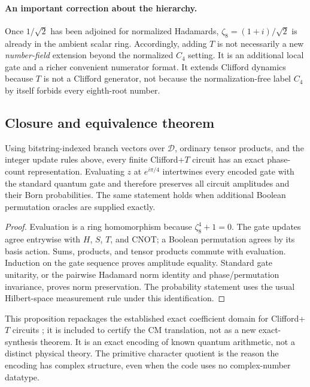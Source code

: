 \paragraph{An important correction about the hierarchy.}
Once $1/\sqrt2$ has been adjoined for normalized Hadamards, $\zeta_8=(1+i)/\sqrt2$ is already in the ambient scalar ring. Accordingly, adding $T$ is not necessarily a new \emph{number-field} extension beyond the normalized $C_4$ setting. It is an additional local gate and a richer convenient numerator format. It extends Clifford dynamics because $T$ is not a Clifford generator, not because the normalization-free label $C_4$ by itself forbids every eighth-root number.

\subsection{Closure and equivalence theorem}
\begin{proposition}\label{thm:exact}
Using bitstring-indexed branch vectors over $\mathcal D$, ordinary tensor products, and the integer update rules above, every finite Clifford+$T$ circuit has an exact phase-count representation. Evaluating $z$ at $e^{i\pi/4}$ intertwines every encoded gate with the standard quantum gate and therefore preserves all circuit amplitudes and their Born probabilities. The same statement holds when additional Boolean permutation oracles are supplied exactly.
\end{proposition}
\begin{proof}
Evaluation is a ring homomorphism because $\zeta_8^4+1=0$. The gate updates agree entrywise with $H$, $S$, $T$, and CNOT; a Boolean permutation agrees by its basis action. Sums, products, and tensor products commute with evaluation. Induction on the gate sequence proves amplitude equality. Standard gate unitarity, or the pairwise Hadamard norm identity and phase/permutation invariance, proves norm preservation. The probability statement uses the usual Hilbert-space measurement rule under this identification.
\end{proof}
This proposition repackages the established exact coefficient domain for Clifford+$T$ circuits \cite{giles,kmm}; it is included to certify the CM translation, not as a new exact-synthesis theorem. It is an exact encoding of known quantum arithmetic, not a distinct physical theory. The primitive character quotient is the reason the encoding has complex structure, even when the code uses no complex-number datatype.

